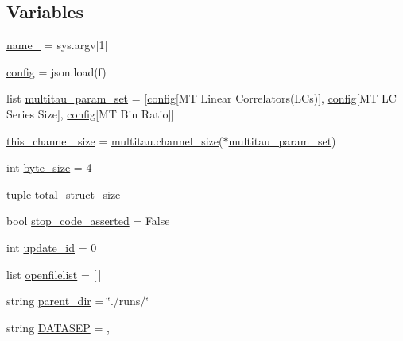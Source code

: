 \subsection*{Variables}
\begin{DoxyCompactItemize}
\item 
\hyperlink{namespacephoton__statistics_a729c361165a662402f88b585477d2ee6}{name\+\_\+} = sys.\+argv\mbox{[}1\mbox{]}
\item 
\hyperlink{namespacephoton__statistics_a4176c548148b1c86da6ddf320ab00e90}{config} = json.\+load(f)
\item 
list \hyperlink{namespacephoton__statistics_a3c57d728c4b1cdcb2b6ca63bc6adfc4d}{multitau\+\_\+param\+\_\+set} = \mbox{[}\hyperlink{namespacephoton__statistics_a4176c548148b1c86da6ddf320ab00e90}{config}\mbox{[}\textquotesingle{}MT Linear Correlators(L\+Cs)\textquotesingle{}\mbox{]}, \hyperlink{namespacephoton__statistics_a4176c548148b1c86da6ddf320ab00e90}{config}\mbox{[}\textquotesingle{}MT LC Series Size\textquotesingle{}\mbox{]}, \hyperlink{namespacephoton__statistics_a4176c548148b1c86da6ddf320ab00e90}{config}\mbox{[}\textquotesingle{}MT Bin Ratio\textquotesingle{}\mbox{]}\mbox{]}
\item 
\hyperlink{namespacephoton__statistics_a397f80b778ada9e9d514e3ed06936540}{this\+\_\+channel\+\_\+size} = \hyperlink{namespacemultitau_a1022c52950a892396ac45e7de5379e12}{multitau.\+channel\+\_\+size}($\ast$\hyperlink{namespacephoton__statistics_a3c57d728c4b1cdcb2b6ca63bc6adfc4d}{multitau\+\_\+param\+\_\+set})
\item 
int \hyperlink{namespacephoton__statistics_a12cca295f67eb3583c567d9907a3fe4f}{byte\+\_\+size} = 4
\item 
tuple \hyperlink{namespacephoton__statistics_aa8b4fc62029e126fa660593daaa282f8}{total\+\_\+struct\+\_\+size}
\item 
bool \hyperlink{namespacephoton__statistics_ae06425daaa0688ab0ff42c7619615e1d}{stop\+\_\+code\+\_\+asserted} = False
\item 
int \hyperlink{namespacephoton__statistics_aa0ea01ea8f5c4844ed6c10dbe51d0497}{update\+\_\+id} = 0
\item 
list \hyperlink{namespacephoton__statistics_ad632a8023bd406f2a2486a1c5d3e7832}{openfilelist} = \mbox{[}$\,$\mbox{]}
\item 
string \hyperlink{namespacephoton__statistics_a255f06b87745f05837e1623b921ae692}{parent\+\_\+dir} = \char`\"{}./runs/\char`\"{}
\item 
string \hyperlink{namespacephoton__statistics_ab381c3496e1a3a8d6dae99e66447c10c}{D\+A\+T\+A\+S\+EP} = \textquotesingle{},\textquotesingle{}

\end{DoxyCompactItemize}
